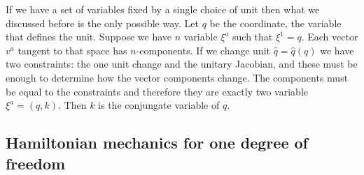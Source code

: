 \documentclass[11pt]{article}
\begin{document}
If we have a set of variables fixed by a single choice of unit then what we discussed before is the only possible way. Let $q$ be the coordinate, the variable that defines the unit. Suppose we have $n$ variable $\xi^a$ such that $\xi^1 = q$. Each vector $v^a$ tangent to that space has $n$-components. If we change unit $\hat{q}=\hat{q}(q)$ we have two constraints: the one unit change and the unitary Jacobian, and these must be enough to determine how the vector components change. The components must be equal to the constraints and therefore they are exactly two variable $\xi^a = (q, k)$. Then $k$ is the conjungate variable of $q$.

\subsection*{Hamiltonian mechanics for one degree of freedom}
\end{document}
